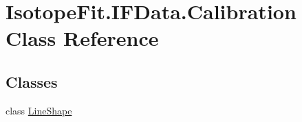 \hypertarget{class_isotope_fit_1_1_i_f_data_1_1_calibration}{}\section{Isotope\+Fit.\+I\+F\+Data.\+Calibration Class Reference}
\label{class_isotope_fit_1_1_i_f_data_1_1_calibration}
\subsection*{Classes}
\begin{DoxyCompactItemize}
\item 
class \hyperlink{class_isotope_fit_1_1_i_f_data_1_1_calibration_1_1_line_shape}{Line\+Shape}
\end{DoxyCompactItemize}
